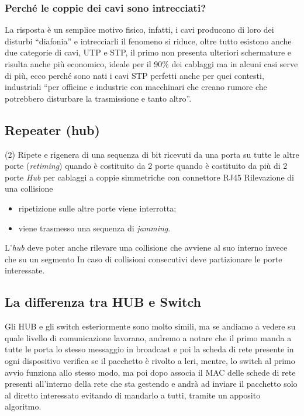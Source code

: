 \documentclass{book}
\begin{document}
\subsubsection{Perché le coppie dei cavi sono intrecciati?}
La risposta è un semplice motivo fisico, infatti, i cavi producono di loro dei
disturbi ``diafonia'' e intrecciarli il fenomeno si riduce, oltre tutto
esistono anche due categorie di cavi, UTP e STP, il primo non presenta
ulteriori schermature e risulta anche più economico, ideale per il 90\% dei
cablaggi ma in alcuni casi serve di più, ecco perché sono nati i cavi STP
perfetti anche per quei contesti, industriali ``per officine e industrie con
macchinari che creano rumore che potrebbero disturbare la trasmissione e tanto
altro''.
\subsection{Repeater (hub)}
\begin{tasks}(2)
	\task Ripete e rigenera di una sequenza di bit ricevuti da una porta su tutte
	le altre porte (\textit{retiming})
	 quando è costituito da 2 porte
	 quando è costituito da più di 2 porte 
	\task \textit{Hub} per cablaggi a coppie simmetriche con connettore RJ45
	\task Rilevazione di una collisione
	\begin{itemize}
		\item ripetizione sulle altre porte viene interrotta;
		\item viene trasmesso una sequenza di \textit{jamming}.
	\end{itemize}
	\task L'\textit{hub} deve poter anche rilevare una collisione che avviene
	al suo interno invece che su un segmento
	\task In caso di collisioni consecutivi deve partizionare le porte
	interessate.
\end{tasks}

\subsection{La differenza tra HUB e Switch}
Gli HUB e gli switch esteriormente sono molto simili, ma se andiamo a vedere su
quale livello di comunicazione lavorano, andremo a notare che il primo manda a
tutte le porta lo stesso messaggio in broadcast e poi la scheda di rete
presente in ogni dispositivo verifica se il pacchetto è rivolto a leri, mentre,
lo switch al primo avvio funziona allo stesso modo, ma poi dopo associa il MAC
delle schede di rete presenti all'interno della rete che sta gestendo e andrà
ad inviare il pacchetto solo al diretto interessato evitando di mandarlo a
tutti, tramite un apposito algoritmo.
\end{document}
